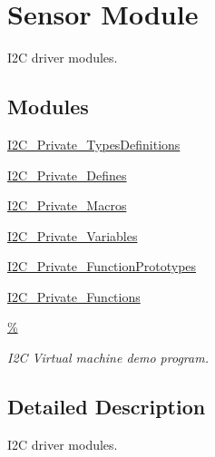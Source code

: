 \hypertarget{group___i2_c}{\section{Sensor Module}
\label{group___i2_c}
}


I2\-C driver modules.  


\subsection*{Modules}
\begin{DoxyCompactItemize}
\item 
\hyperlink{group___i2_c___private___types_definitions}{I2\-C\-\_\-\-Private\-\_\-\-Types\-Definitions}
\item 
\hyperlink{group___i2_c___private___defines}{I2\-C\-\_\-\-Private\-\_\-\-Defines}
\item 
\hyperlink{group___i2_c___private___macros}{I2\-C\-\_\-\-Private\-\_\-\-Macros}
\item 
\hyperlink{group___i2_c___private___variables}{I2\-C\-\_\-\-Private\-\_\-\-Variables}
\item 
\hyperlink{group___i2_c___private___function_prototypes}{I2\-C\-\_\-\-Private\-\_\-\-Function\-Prototypes}
\item 
\hyperlink{group___i2_c___private___functions}{I2\-C\-\_\-\-Private\-\_\-\-Functions}
\item 
\hyperlink{group___c_l_a_s_s}{\%}
\begin{DoxyCompactList}\small\item\em I2\-C Virtual machine demo program. \end{DoxyCompactList}\end{DoxyCompactItemize}


\subsection{Detailed Description}
I2\-C driver modules. 